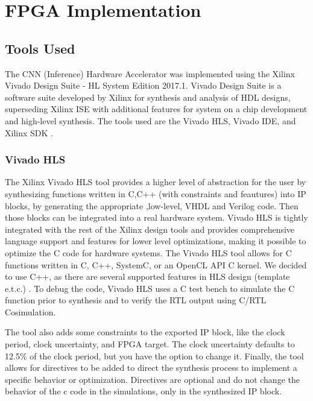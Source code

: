 \chapter{FPGA Implementation} %
\label{Chapter5}

\section{Tools Used}
The CNN (Inference) Hardware Accelerator was implemented using the Xilinx Vivado Design Suite - HL System Edition 2017.1. Vivado Design Suite is a software suite developed by Xilinx for synthesis and analysis of HDL designs, superseding Xilinx ISE with additional features for system on a chip development and high-level synthesis. The tools used are the Vivado HLS, Vivado IDE, and Xilinx SDK \cite{Link1}.

\subsection{Vivado HLS}
The Xilinx Vivado HLS tool \cite{Link3} provides a higher level of abstraction for the user by synthesizing functions written in C,C++ (with constraints and feautures) into IP blocks, by generating the appropriate ,low-level, VHDL and Verilog code. Then those blocks can be integrated into a real hardware system. Vivado HLS is tightly integrated with the rest of the Xilinx design tools and provides comprehensive language support and features for lower level optimizations, making it possible to optimize the C code for hardware systems.
The Vivado HLS tool allows for C functions written in C, C++, SystemC, or an OpenCL API C kernel. We decided to use C++, as there are several supported features in HLS design (template e.t.c.) . To debug the code, Vivado HLS uses a C test bench to simulate the C function prior to synthesis and to verify the RTL output using C/RTL Cosimulation.

The tool also adds some constraints to the exported IP block, like the clock period, clock uncertainty, and FPGA target. The clock uncertainty defaults to 12.5\% of the clock period, but you have the option to change it. Finally, the tool allows for directives to be added to direct the synthesis process to implement a specific behavior or optimization. Directives are optional and do not change the behavior of the c code in the simulations, only in the synthesized IP block.  

